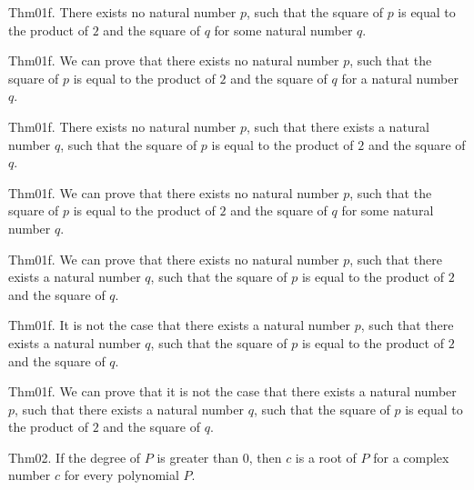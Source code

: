 \documentclass{article}
\begin{document}
Thm01f. There exists no natural number $p$, such that the square of $p$ is equal to the product of $2$ and the square of $q$ for some natural number $q$.

Thm01f. We can prove that there exists no natural number $p$, such that the square of $p$ is equal to the product of $2$ and the square of $q$ for a natural number $q$.

Thm01f. There exists no natural number $p$, such that there exists a natural number $q$, such that the square of $p$ is equal to the product of $2$ and the square of $q$.

Thm01f. We can prove that there exists no natural number $p$, such that the square of $p$ is equal to the product of $2$ and the square of $q$ for some natural number $q$.

Thm01f. We can prove that there exists no natural number $p$, such that there exists a natural number $q$, such that the square of $p$ is equal to the product of $2$ and the square of $q$.

Thm01f. It is not the case that there exists a natural number $p$, such that there exists a natural number $q$, such that the square of $p$ is equal to the product of $2$ and the square of $q$.

Thm01f. We can prove that it is not the case that there exists a natural number $p$, such that there exists a natural number $q$, such that the square of $p$ is equal to the product of $2$ and the square of $q$.

Thm02. If the degree of $P$ is greater than $0$, then $c$ is a root of $P$ for a complex number $c$ for every polynomial $P$.
\end{document}

